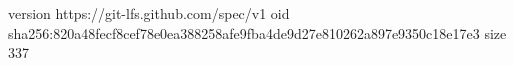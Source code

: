 version https://git-lfs.github.com/spec/v1
oid sha256:820a48fecf8cef78e0ea388258afe9fba4de9d27e810262a897e9350c18e17e3
size 337
